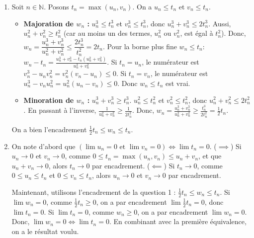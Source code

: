 \documentclass[solutions]{exercices}
\begin{document}
\begin{solution}
	\begin{enumerate}
		\item Soit $n \in \mathbb{N}$. Posons $t_n = \max(u_n, v_n)$. On a $u_n \le t_n$ et $v_n \le t_n$.
		      \begin{itemize}
			      \item \textbf{Majoration de $w_n$ :}
			            $u_n^3 \le t_n^3$ et $v_n^3 \le t_n^3$, donc $u_n^3+v_n^3 \le 2t_n^3$.
			            Aussi, $u_n^2+v_n^2 \ge t_n^2$ (car au moins un des termes, $u_n^2$ ou $v_n^2$, est égal à $t_n^2$).
			            Donc, $w_n = \dfrac{u_n^3+v_n^3}{u_n^2+v_n^2} \le \dfrac{2t_n^3}{t_n^2} = 2t_n$.
			            Pour la borne plus fine $w_n \le t_n$: $w_n - t_n = \frac{u_n^3+v_n^3 - t_n(u_n^2+v_n^2)}{u_n^2+v_n^2}$. Si $t_n=u_n$, le numérateur est $v_n^3 - u_n v_n^2 = v_n^2(v_n-u_n) \le 0$. Si $t_n=v_n$, le numérateur est $u_n^3 - v_n u_n^2 = u_n^2(u_n-v_n) \le 0$. Donc $w_n \le t_n$ est vrai.

			      \item \textbf{Minoration de $w_n$ :}
			            $u_n^3+v_n^3 \ge t_n^3$.
			            $u_n^2 \le t_n^2$ et $v_n^2 \le t_n^2$, donc $u_n^2+v_n^2 \le 2t_n^2$.
			            En passant à l'inverse, $\frac{1}{u_n^2+v_n^2} \ge \frac{1}{2t_n^2}$.
			            Donc, $w_n = \frac{u_n^3+v_n^3}{u_n^2+v_n^2} \ge \frac{t_n^3}{2t_n^2} = \frac{1}{2}t_n$.
		      \end{itemize}
		      On a bien l'encadrement $\frac{1}{2}t_n \le w_n \le t_n$.
		\item On note d'abord que $(\lim u_n=0 \text{ et } \lim v_n=0) \iff \lim t_n = 0$.
		      ($\implies$) Si $u_n \to 0$ et $v_n \to 0$, comme $0 \le t_n = \max(u_n,v_n) \le u_n+v_n$, et que $u_n+v_n \to 0$, alors $t_n \to 0$ par encadrement.
		      ($\impliedby$) Si $t_n \to 0$, comme $0 \le u_n \le t_n$ et $0 \le v_n \le t_n$, alors $u_n \to 0$ et $v_n \to 0$ par encadrement.

		      Maintenant, utilisons l'encadrement de la question 1 : $\frac{1}{2}t_n \le w_n \le t_n$.
		      Si $\lim w_n=0$, comme $\frac{1}{2}t_n \ge 0$, on a par encadrement $\lim \frac{1}{2}t_n = 0$, donc $\lim t_n=0$.
		      Si $\lim t_n=0$, comme $w_n \ge 0$, on a par encadrement $\lim w_n=0$.
		      Donc, $\lim w_n=0 \iff \lim t_n=0$.
		      En combinant avec la première équivalence, on a le résultat voulu.
	\end{enumerate}
\end{solution}
\end{document}
